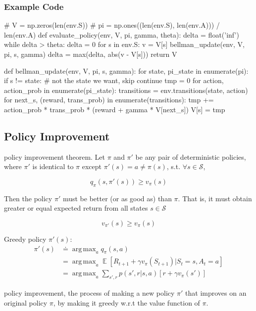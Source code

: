 \documentclass[lang=en,mode=geye,device=normal,color=blue,14pt]{elegantnote}
\DeclareMathOperator*{\E}{\mathbb{E}}
\DeclareMathOperator*{\1}{\mathbbm{1}}
\DeclareMathOperator*{\argmax}{arg\,max}
\begin{document}
\subsubsection{Example Code}
\begin{python}
# V = np.zeros(len(env.S))
# pi = np.ones((len(env.S), len(env.A))) / len(env.A)
def evaluate_policy(env, V, pi, gamma, theta):
    delta = float('inf')
    while delta > theta:
        delta = 0
        for s in env.S:
            v = V[s]
            bellman_update(env, V, pi, s, gamma)
            delta = max(delta, abs(v - V[s]))
    return V

def bellman_update(env, V, pi, s, gamma):
    for state, pi_state in enumerate(pi):
        if s != state:  # not the state we want, skip
            continue
        tmp = 0
        for action, action_prob in enumerate(pi_state):
            transitions = env.transitions(state, action)
            for next_s, (reward, trans_prob) in enumerate(transitions):
                tmp += action_prob * trans_prob * (reward + gamma * V[next_s])
        V[s] = tmp
\end{python}

\subsection{Policy Improvement}

\begin{definition}
policy improvement theorem. Let $\pi$ and $\pi'$ be any pair of deterministic policies, where $\pi'$ is identical to $\pi$ except $\pi'(s) = a \neq \pi(s)$, s.t. $\forall s \in \mathcal{S}$,

$$ q_\pi (s,\pi'(s)) \geq v_\pi(s) $$

Then the policy $\pi'$ must be better (or as good as) than $\pi$. That is, it must obtain greater or equal expected return from all states $s \in \mathcal{S}$

$$ v_{\pi'}(s) \geq v_\pi (s) $$
\end{definition}

Greedy policy $\pi'(s)$:
\begin{align*}
\pi'(s) &\doteq \argmax_a q_\pi (s,a) \\
&= \argmax_a \E [ R_{t+1} + \gamma v_\pi (S_{t+1}) | S_t = s, A_t = a] \\
&= \argmax_a \sum_{s',r} p(s',r|s,a)[r+\gamma v_\pi(s')]
\end{align*}

\begin{definition}
policy improvement, the process of making a new policy $\pi'$ that improves on an original policy $\pi$, by making it greedy w.r.t the value function of $\pi$.
\end{definition}
 
\end{document}
